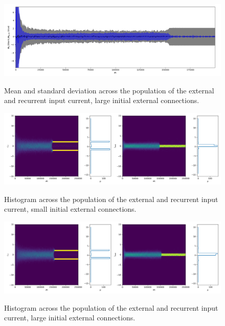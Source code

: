 \documentclass[10pt,a4paper]{article}
\begin{document}
\begin{figure}
\includegraphics[width=\textwidth]{../../code/rnn_prox_dist_non_bin/plots/plastic_input_weights_large_init/I_ee_I_eext_mean_std.png}
\label{fig:I_std_large_init}
\caption{Mean and standard deviation across the population of the external and recurrent input current, large initial external connections.}
\end{figure}

\begin{figure}
\includegraphics[width=\textwidth]{../../code/rnn_prox_dist_non_bin/plots/plastic_input_weights_small_init/input_hist_time.png}
\label{fig:I_hist_small_init}
\caption{Histogram across the population of the external and recurrent input current, small initial external connections.}
\end{figure}

\begin{figure}
\includegraphics[width=\textwidth]{../../code/rnn_prox_dist_non_bin/plots/plastic_input_weights_large_init/input_hist_time.png}
\label{fig:I_hist_large_init}
\caption{Histogram across the population of the external and recurrent input current, large initial external connections.}
\end{figure}



\newpage


\end{document}
